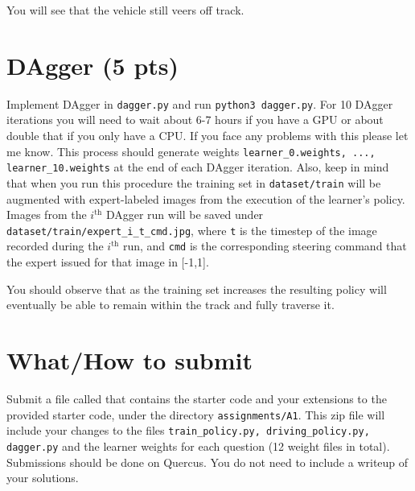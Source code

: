 \documentclass[a4paper,10pt]{article}
\def\code#1{\texttt{#1}}
\begin{document}
\noindent You will see that the vehicle still veers off track. 

\section{DAgger (5 pts)}
Implement DAgger in \code{dagger.py} and run \code{python3 dagger.py}. For 10 DAgger iterations you will need to wait about 6-7 hours if you have a GPU or about double that if you only have a CPU. If you
face any problems with this please let me know. This process should generate weights \code{learner\_0.weights, ..., learner\_10.weights} at the end of each DAgger iteration. Also, keep in mind that when you 
run this procedure the training set in \code{dataset/train} will be augmented with expert-labeled images from the execution of the learner's policy. Images from the $i^{\text{th}}$ DAgger run will be saved under 
\code{dataset/train/expert\_i\_t\_cmd.jpg}, where \code{t} is the timestep of the image recorded during the $i^{\text{th}}$ run, and \code{cmd} is the corresponding steering command that the expert issued for 
that image in [-1,1].  

\noindent You should observe that as the training set increases the resulting policy will eventually be able to remain within the track and fully traverse it.

\section{What/How to submit}
Submit a file called  that contains the starter code and your extensions to the provided starter code, under the directory \code{assignments/A1}. 
This zip file will include your changes to the files \code{train\_policy.py, driving\_policy.py, dagger.py} and the learner weights for each question (12 weight files in total). Submissions should be 
done on Quercus. You do not need to include a writeup of your solutions. 
\end{document}
